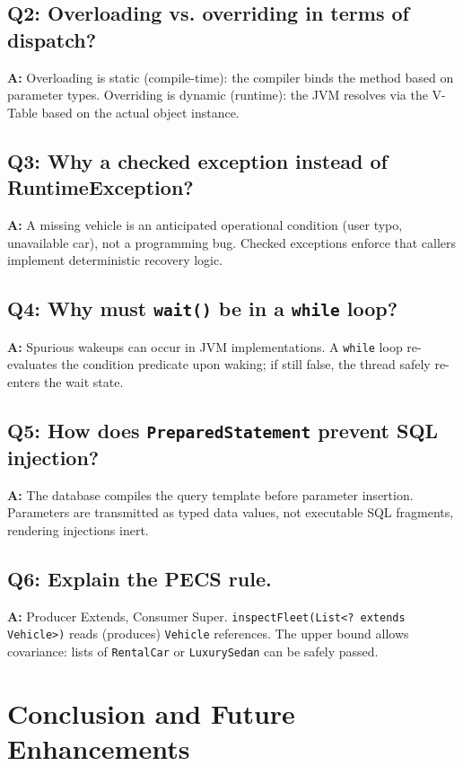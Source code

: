 \documentclass[11pt,a4paper]{article}
\begin{document}
\subsection*{Q2: Overloading vs. overriding in terms of dispatch?}
\textbf{A:} Overloading is static (compile-time): the compiler binds the method based on parameter types. Overriding is dynamic (runtime): the JVM resolves via the V-Table based on the actual object instance.

\subsection*{Q3: Why a checked exception instead of RuntimeException?}
\textbf{A:} A missing vehicle is an anticipated operational condition (user typo, unavailable car), not a programming bug. Checked exceptions enforce that callers implement deterministic recovery logic.

\subsection*{Q4: Why must \texttt{wait()} be in a \texttt{while} loop?}
\textbf{A:} Spurious wakeups can occur in JVM implementations. A \texttt{while} loop re-evaluates the condition predicate upon waking; if still false, the thread safely re-enters the wait state.

\subsection*{Q5: How does \texttt{PreparedStatement} prevent SQL injection?}
\textbf{A:} The database compiles the query template before parameter insertion. Parameters are transmitted as typed data values, not executable SQL fragments, rendering injections inert.

\subsection*{Q6: Explain the PECS rule.}
\textbf{A:} Producer Extends, Consumer Super. \texttt{inspectFleet(List<? extends Vehicle>)} reads (produces) \texttt{Vehicle} references. The upper bound allows covariance: lists of \texttt{RentalCar} or \texttt{LuxurySedan} can be safely passed.

\section{Conclusion and Future Enhancements}
\label{sec:conclusion}
\end{document}
